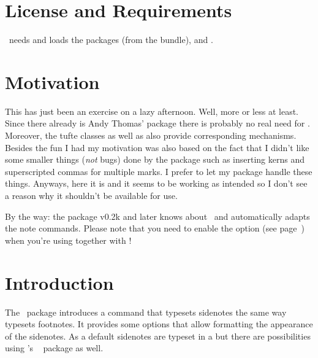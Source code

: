 \documentclass[load-preamble+]{cnltx-doc}
\makeatletter
\newcommand*\defaultsidenotes{%
  \setsidenotes{
    note-mark-format = \@textsuperscript{\normalfont\normalcolor##1},
    text-format      = \normalfont\normalcolor\footnotesize
  }}
\makeatother
\begin{document}
\section{License and Requirements}\label{sec:license}
\license

\snotez\ needs and loads the packages  (from the 
bundle),
 and
.

\section{Motivation}\label{sec:motivation}
This has just been an exercise on a lazy
afternoon.
Well, more or less at least.  Since there already is Andy Thomas'
 package there is
probably no real need for \snotez.  Moreover, the tufte
classes as well as
 also provide corresponding
mechanisms.  Besides the fun I had my motivation was also based on the fact
that I didn't like some smaller things (\emph{not} bugs) done by the
 package such as inserting kerns and superscripted commas for
multiple marks.  I prefer to let my 
package handle these things.  Anyways, here it is and it seems to be working
as intended so I don't see a reason why it shouldn't be available for use.

By the way: the  package v0.2k and later knows about \snotez\ and
automatically adapts the note commands.  Please note that you need to enable
the  option (see page~\pageref{key:dblarg}) when you're using
 together with \snotez!

\section{Introduction}\label{sec:introduction}
The \snotez\ package introduces a  command%
\begingroup\defaultsidenotes
{}
\endgroup
that typesets sidenotes the same way  typesets footnotes.  It
provides some options that allow formatting the appearance of the
sidenotes.  As a default sidenotes
are typeset in a  but there are possibilities using \kohm's
~\cite{pkg:marginnote} package as well.
\end{document}
